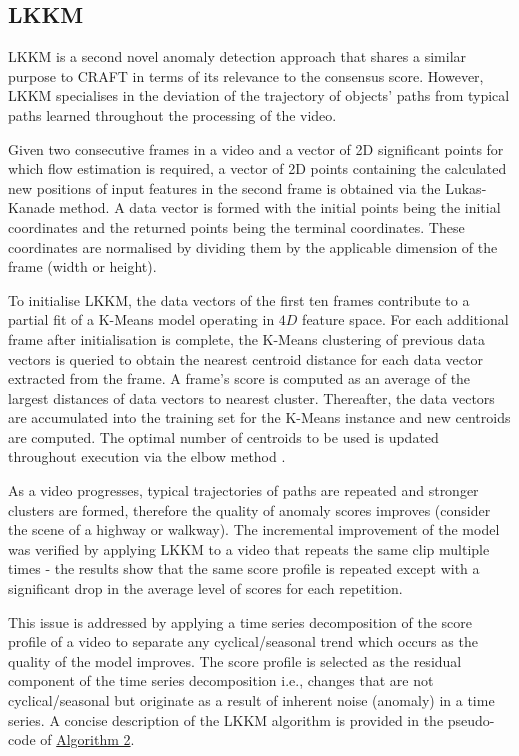 \documentclass[sigplan,authorversion,nonacm, 9pt]{acmart}
\begin{document}
\subsection{LKKM}
LKKM is a second novel anomaly detection approach that shares a similar purpose to CRAFT in terms of its relevance to the consensus score. However, LKKM specialises in the deviation of the trajectory of objects' paths from typical paths learned throughout the processing of the video.
\par 
Given two consecutive frames in a video and a vector of 2D significant points for which flow estimation is required, a vector of 2D points containing the calculated new positions of input features in the second frame is obtained via the Lukas-Kanade method. A data vector is formed with the initial points being the initial coordinates and the returned points being the terminal coordinates. These coordinates are normalised by dividing them by the applicable dimension of the frame (width or height). 
\par
To initialise LKKM, the data vectors of the first ten frames contribute to a partial fit of a K-Means model operating in $4D$ feature space. 
For each additional frame after initialisation is complete, the K-Means clustering of previous data vectors is queried to obtain the nearest centroid distance for each data vector extracted from the frame.
A frame’s score is computed as an average of the largest distances of data vectors to nearest cluster. Thereafter, the data vectors are accumulated into the training set for the K-Means instance and new centroids are computed. The optimal number of centroids to be used is updated throughout execution via the elbow method \cite{elbow}.
\par
As a video progresses, typical trajectories of paths are repeated and stronger clusters are formed, therefore the quality of anomaly scores improves (consider the scene of a highway or walkway). The incremental improvement of the model was verified by applying LKKM to a video that repeats the same clip multiple times - the results show that the same score profile is repeated except with a significant drop in the average level of scores for each repetition.
\par
This issue is addressed by applying a time series decomposition of the score profile of a video to separate any cyclical/seasonal trend which occurs as the quality of the model improves. The score profile is selected as the residual component of the time series decomposition i.e., changes that are not cyclical/seasonal but originate as a result of inherent noise (anomaly) in a time series.
A concise description of the LKKM algorithm is provided in the pseudo-code of \hyperref[fig:psLKKM]{Algorithm 2}.
\end{document}
